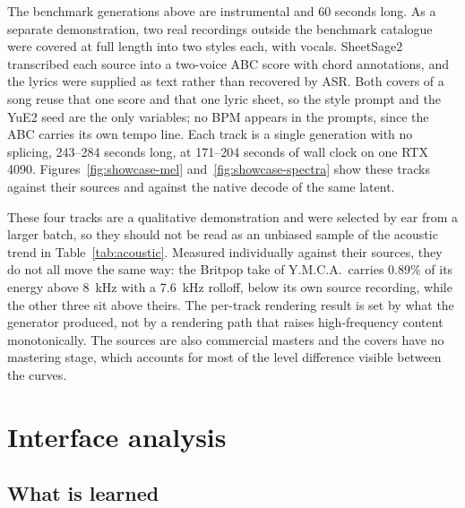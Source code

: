 \documentclass[11pt,a4paper]{article}
\begin{document}
The benchmark generations above are instrumental and 60 seconds long. As a separate demonstration, two real recordings outside the benchmark catalogue were covered at full length into two styles each, with vocals. SheetSage2 transcribed each source into a two-voice ABC score with chord annotations, and the lyrics were supplied as text rather than recovered by ASR. Both covers of a song reuse that one score and that one lyric sheet, so the style prompt and the YuE2 seed are the only variables; no BPM appears in the prompts, since the ABC carries its own tempo line. Each track is a single generation with no splicing, 243--284 seconds long, at 171--204 seconds of wall clock on one RTX 4090. Figures~\ref{fig:showcase-mel} and~\ref{fig:showcase-spectra} show these tracks against their sources and against the native decode of the same latent.

These four tracks are a qualitative demonstration and were selected by ear from a larger batch, so they should not be read as an unbiased sample of the acoustic trend in Table~\ref{tab:acoustic}. Measured individually against their sources, they do not all move the same way: the Britpop take of Y.M.C.A.\ carries 0.89\% of its energy above 8~kHz with a 7.6~kHz rolloff, below its own source recording, while the other three sit above theirs. The per-track rendering result is set by what the generator produced, not by a rendering path that raises high-frequency content monotonically. The sources are also commercial masters and the covers have no mastering stage, which accounts for most of the level difference visible between the curves.

\section{Interface analysis}

\subsection{What is learned}
\end{document}
